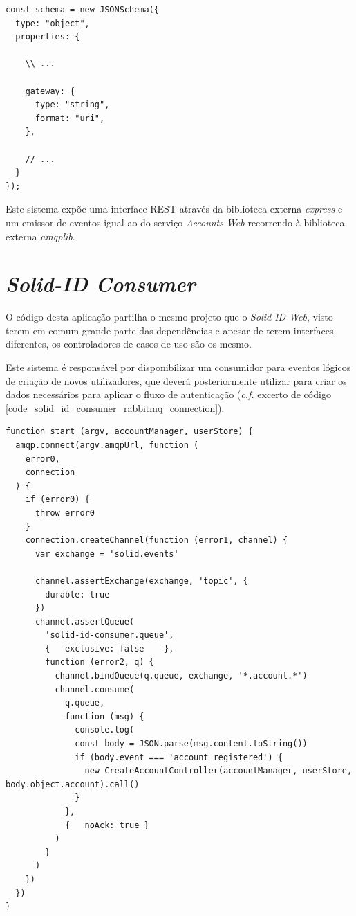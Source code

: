 \begin{lstlisting}[caption={Alteração ao \emph{ProviderSchema} na biblioteca \emph{oidc-op}}, label={code_solid_id_web_oidc_op}]
const schema = new JSONSchema({
  type: "object",
  properties: {
  
    \\ ...

    gateway: {
      type: "string",
      format: "uri",
    },

    // ...
  }  
});

\end{lstlisting}

Este sistema expõe uma interface REST através da biblioteca externa \emph{express} e um emissor de eventos igual ao do serviço \emph{Accounts Web} recorrendo à biblioteca externa \emph{amqplib}.

\section{\emph{Solid-ID Consumer}}
O código desta aplicação partilha o mesmo projeto que o \emph{Solid-ID Web}, visto terem em comum grande parte das dependências e apesar de terem interfaces diferentes, os controladores de casos de uso são os mesmo.

Este sistema é responsável por disponibilizar um consumidor para eventos lógicos de criação de novos utilizadores, que deverá posteriormente utilizar para criar os dados necessários para aplicar o fluxo de autenticação (\emph{c.f.} excerto de código \ref{code_solid_id_consumer_rabbitmq_connection}).

\begin{lstlisting}[caption={\emph{Consumer} responsável pela ligação ao \emph{RabbitMQ}}, label={code_solid_id_consumer_rabbitmq_connection}]
function start (argv, accountManager, userStore) {
  amqp.connect(argv.amqpUrl, function (
    error0,
    connection
  ) {
    if (error0) {
      throw error0
    }
    connection.createChannel(function (error1, channel) {
      var exchange = 'solid.events'

      channel.assertExchange(exchange, 'topic', {
        durable: true
      })
      channel.assertQueue(
        'solid-id-consumer.queue',
        {   exclusive: false    },
        function (error2, q) {
          channel.bindQueue(q.queue, exchange, '*.account.*')
          channel.consume(
            q.queue,
            function (msg) {
              console.log(
              const body = JSON.parse(msg.content.toString())
              if (body.event === 'account_registered') {
                new CreateAccountController(accountManager, userStore, body.object.account).call()
              }
            },
            {   noAck: true }
          )
        }
      )
    })
  })
}

\end{lstlisting}

